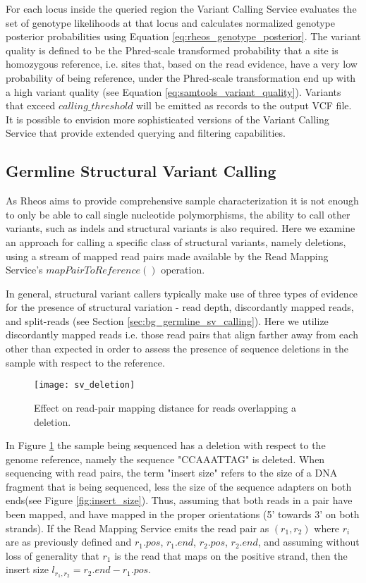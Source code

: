 For each locus inside the queried region the Variant Calling Service evaluates the set of genotype likelihoods at that locus and calculates normalized genotype posterior probabilities using Equation \ref{eq:rheos_genotype_posterior}. The variant quality is defined to be the Phred-scale transformed probability that a site is homozygous reference, i.e. sites that, based on the read evidence, have a very low probability of being reference, under the Phred-scale transformation end up with a high variant quality (see Equation \ref{eq:samtools_variant_quality}). Variants that exceed $calling\_threshold$ will be emitted as records to the output VCF file. It is possible to envision more sophisticated versions of the Variant Calling Service that provide extended querying and filtering capabilities.

\subsection{Germline Structural Variant Calling}\label{sec:main_body_sv_calling}

As Rheos aims to provide comprehensive sample characterization it is not enough to only be able to call single nucleotide polymorphisms, the ability to call other variants, such as indels and structural variants is also required. Here we examine an approach for calling a specific class of structural variants, namely deletions, using a stream of mapped read pairs made available by the Read Mapping Service's $mapPairToReference()$ operation. 

In general, structural variant callers typically make use of three types of evidence for the presence of structural variation - read depth, discordantly mapped reads, and split-reads (see Section \ref{sec:bg_germline_sv_calling}). Here we utilize discordantly mapped reads i.e. those read pairs that align farther away from each other than expected in order to assess the presence of sequence deletions in the sample with respect to the reference.

\begin{figure}[H]
    \texttt{[image: sv\_deletion]}
    \centering
    \caption {Effect on read-pair mapping distance for reads overlapping a deletion.}
    \label{fig:sv_deletion}
\end{figure}

In Figure \ref{fig:sv_deletion} the sample being sequenced has a deletion with respect to the genome reference, namely the sequence "CCAAATTAG" is deleted. When sequencing with read pairs, the term "insert size" refers to the size of a DNA fragment that is being sequenced, less the size of the sequence adapters on both ends(see Figure \ref{fig:insert_size}). Thus, assuming that both reads in a pair have been mapped, and have mapped in the proper orientations (5' towards 3' on both strands). If the Read Mapping Service emits the read pair as $(r_1, r_2)$ where $r_i$ are as previously defined and $r_1.pos$, $r_1.end$, $r_2.pos$, $r_2.end$, and assuming without loss of generality that $r_1$ is the read that maps on the positive strand, then the insert size $l_{r_1,r_2} = r_2.end - r_1.pos$.    

